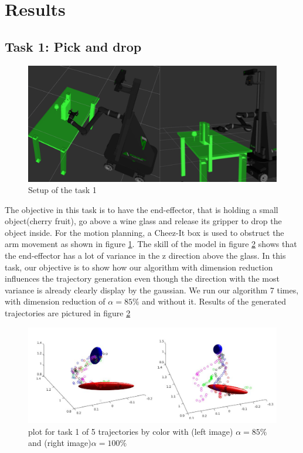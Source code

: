 \documentclass[letterpaper, 10 pt, conference]{ieeeconf}  %
\begin{document}
\section{Results}
\subsection{Task 1: Pick and drop}
\begin{figure}[h]
	\centering
	\includegraphics[scale=0.22]{figure/task1Scenario.png}
	\caption{Setup of the task 1}
	\label{task1Scenario}
\end{figure}
The objective in this task is to have the end-effector, that is holding a small object(cherry fruit), go above a wine glass and release its gripper to drop the object inside. For the motion planning, a Cheez-It box is used to obstruct the arm movement as shown in figure \ref{task1Scenario}. The skill of the model in figure \ref{trajectoriesTask1} shows that the end-effector has a lot of variance in the z direction above the glass. In this task, our objective is to show how our algorithm with dimension reduction influences the trajectory generation even though the direction with the most variance is already clearly display by the gaussian. We run our algorithm 7 times, with dimension reduction of $\alpha=85 \%$ and without it. Results of the generated trajectories are pictured in figure \ref{trajectoriesTask1} \\
\begin{figure}[h]
	\centering
	\includegraphics[scale=0.24]{figure/plotMixedTask1.png}
	\caption{plot for task 1 of 5 trajectories by color with (left image) $\alpha = 85\%$ and (right image)$\alpha = 100\%$ }
	\label{trajectoriesTask1}
\end{figure}
\end{document}
